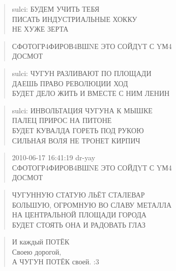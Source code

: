 \poemtitle{***}
\begin{verse}
sulci: БУДЕМ УЧИТЬ ТЕБЯ\\
ПИСАТЬ ИНДУСТРИАЛЬНЫЕ ХОККУ\\
НЕ ХУЖЕ ЗЕРТА
\end{verse}

\poemtitle{***}
\begin{verse}
СФОТОГР4ФИРОВ4ВШNЕ ЭТО СОЙДYТ С YМ4\\
ДОСМОТ
\end{verse}

\poemtitle{***}
\begin{verse}
sulci: ЧУГУН РАЗЛИВАЮТ ПО ПЛОЩАДИ\\
ДАЕШЬ ПРАВО РЕВОЛЮЦИИ ХОД\\
БУДЕТ ДЕЛО ЖИТЬ И ВМЕСТЕ С НИМ ЛЕНИН
\end{verse}

\poemtitle{***}
\begin{verse}
sulci: ИНВОЛЬТАЦИЯ ЧУГУНА К МЫШКЕ\\
ПАЛЕЦ ПРИРОС НА ПИТОНЕ\\
БУДЕТ КУВАЛДА ГОРЕТЬ ПОД РУКОЮ\\
СИЛЬНАЯ ВОЛЯ НЕ ТРОНЕТ КИРПИЧ
\end{verse}

\poemtitle{***}
\begin{verse}
2010-06-17 16:41:19 dr-yay\\
СФОТОГР4ФИРОВ4ВШNЕ ЭТО СОЙДYТ С YМ4\\
ДОСМОТ
\end{verse}

\poemtitle{***}
\begin{verse}
ЧУГУННУЮ СТАТУЮ ЛЬЁТ СТАЛЕВАР\\
БОЛЬШУЮ, ОГРОМНУЮ ВО СЛАВУ МЕТАЛЛА\\
НА ЦЕНТРАЛЬНОЙ ПЛОЩАДИ ГОРОДА\\
БУДЕТ СТОЯТЬ ОНА И РАДОВАТЬ ГЛАЗ
\end{verse}

\poemtitle{***}
\begin{verse}
И каждый ПОТЁК\\
Своею дорогой,\\
А ЧУГУН ПОТЁК своей. :3
\end{verse}

